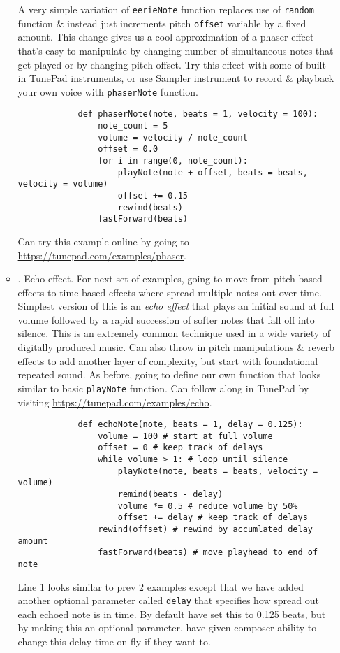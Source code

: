 \documentclass{article}
\begin{document}
\begin{itemize}
\begin{itemize}
		A very simple variation of {\tt eerieNote} function replaces use of {\tt random} function \& instead just increments pitch {\tt offset} variable by a fixed amount. This change gives us a cool approximation of a phaser effect that's easy to manipulate by changing number of simultaneous notes that get played or by changing pitch offset. Try this effect with some of built-in TunePad instruments, or use Sampler instrument to record \& playback your own voice with {\tt phaserNote} function.
		\begin{verbatim}
			def phaserNote(note, beats = 1, velocity = 100):
			    note_count = 5
			    volume = velocity / note_count
			    offset = 0.0
			    for i in range(0, note_count):
			        playNote(note + offset, beats = beats, velocity = volume)
			        offset += 0.15
			        rewind(beats)
			    fastForward(beats)
		\end{verbatim}
		Can try this example online by going to \url{https://tunepad.com/examples/phaser}.
		\item {. Echo effect.} For next set of examples, going to move from pitch-based effects to time-based effects where spread multiple notes out over time. Simplest version of this is an {\it echo effect} that plays an initial sound at full volume followed by a rapid succession of softer notes that fall off into silence. This is an extremely common technique used in a wide variety of digitally produced music. Can also throw in pitch manipulations \& reverb effects to add another layer of complexity, but start with foundational repeated sound. As before, going to define our own function that looks similar to basic {\tt playNote} function. Can follow along in TunePad by visiting \url{https://tunepad.com/examples/echo}.
		\begin{verbatim}
			def echoNote(note, beats = 1, delay = 0.125):
			    volume = 100 # start at full volume
			    offset = 0 # keep track of delays
			    while volume > 1: # loop until silence
			        playNote(note, beats = beats, velocity = volume)
			        remind(beats - delay)
			        volume *= 0.5 # reduce volume by 50%
			        offset += delay # keep track of delays
			    rewind(offset) # rewind by accumlated delay amount
			    fastForward(beats) # move playhead to end of note
		\end{verbatim}
		Line 1 looks similar to prev 2 examples except that we have added another optional parameter called {\tt delay} that specifies how spread out each echoed note is in time. By default have set this to 0.125 beats, but by making this an optional parameter, have given composer ability to change this delay time on fly if they want to.
		

\end{itemize}
\end{itemize}
\end{document}
